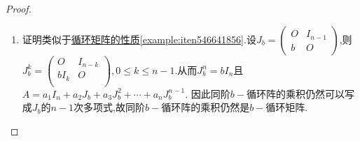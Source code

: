 \documentclass[../../main.tex]{subfiles}%
\begin{document}
\begin{proof}
\begin{enumerate}[(1)]
\item 证明类似于\hyperref[example:iten546641856]{循环矩阵的性质\ref{example:iten546641856}}.设\(J_b=\begin{pmatrix}
O & I_{n - 1}\\
b & O
\end{pmatrix}\),则$J_{b}^{k}=\left( \begin{matrix}
O&		I_{n-k}\\
bI_k&		O\\
\end{matrix} \right) ,0\leqslant k\leqslant n-1$.从而\(J_b^n = bI_n\)且\(A = a_1I_n + a_2J_b + a_3J_b^2+\cdots+ a_nJ_b^{n - 1}\). 因此同阶\(b -\)循环阵的乘积仍然可以写成$J_b$的$n-1$次多项式,故同阶\(b -\)循环阵的乘积仍然是\(b -\)循环矩阵.


\end{enumerate}
\end{proof}
\end{document}

